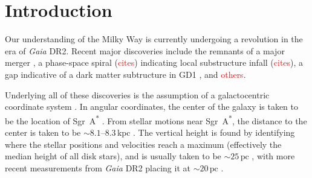 \documentclass[twocolumn]{aastex62}
\newcommand{\Gus}[1]{\textcolor{red}{#1}}
\newcommand{\pc}{\text{pc}}
\newcommand{\kpc}{\text{kpc}}
\begin{document}
\begin{abstract}

\end{abstract}


\section{Introduction} \label{sec:intro}
Our understanding of the Milky Way is currently undergoing a revolution in the
era of {\em Gaia} DR2. Recent major discoveries include the remnants of a
major merger \citep{2018Natur.563...85H}, a phase-space spiral (\Gus{cites})
indicating local substructure infall (\Gus{cites}), a gap indicative of a dark
matter subtructure in GD1 \citep{2018arXiv181103631B}, and \Gus{others}.

Underlying all of these discoveries is the assumption of a galactocentric
coordinate system \citep{2008gady.book.....B}. In angular
coordinates, the center of the galaxy is taken to be the location of
Sgr~A\textsuperscript{*} \citep[e.g.][]{2004ApJ...616..872R}. From stellar
motions near Sgr~A\textsuperscript{*}, the distance to the center is taken to
be $\sim 8.1\text{--}8.3\,\kpc$
\citep{2009ApJ...692.1075G,2018A&A...615L..15G}. The vertical height is found
by identifying where the stellar positions and velocities reach a maximum
(effectively the median height of all disk stars), and is usually taken to be
$\sim 25\,\pc$ \citep{2001ApJ...553..184C}, with more recent measurements from
{\em Gaia} DR2 placing it at $\sim 20\,\pc$ \citep{2019MNRAS.482.1417B}.
\end{document}
